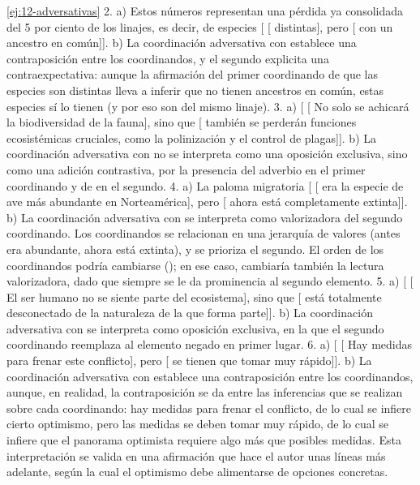 \begin{solucion}{\ref{ej:12-adversativas}}
2. a) Estos números representan una pérdida ya consolidada del 5 por ciento de
los linajes, es decir, de especies [ [ distintas],
pero [ con un ancestro en común]]. b) La coordinación
adversativa con  establece una contraposición entre los coordinandos,
y el segundo explicita una contraexpectativa: aunque la afirmación del primer
coordinando de que las especies son distintas lleva a inferir que no tienen
ancestros en común, estas especies sí lo tienen (y por eso son del mismo linaje).
3. a) [ [ No solo se achicará la biodiversidad de la
fauna], sino que [ también se perderán funciones
ecosistémicas cruciales, como la polinización y el control de plagas]]. b) La
coordinación adversativa con  no se interpreta como una oposición
exclusiva, sino como una adición contrastiva, por la presencia del adverbio
 en el primer coordinando y de  en el segundo. 4. a)
La paloma migratoria [ [ era la especie de ave más
abundante en Norteamérica], pero [ ahora está
completamente extinta]]. b) La coordinación adversativa con  se
interpreta como valorizadora del segundo coordinando. Los coordinandos se
relacionan en una jerarquía de valores (antes era abundante, ahora está extinta),
y se prioriza el segundo. El orden de los coordinandos podría cambiarse
(); en ese caso, cambiaría también la
lectura valorizadora, dado que siempre se le da prominencia al segundo
elemento. 5.
a) [ [ El ser humano no se siente parte del
ecosistema], sino que [ está totalmente desconectado de
la naturaleza de la que forma parte]]. b) La coordinación adversativa con
 se interpreta como oposición exclusiva, en la que el segundo
coordinando reemplaza al elemento negado en primer lugar. 6. a) [
[ Hay medidas para frenar este conflicto], pero
[ se tienen que tomar muy rápido]]. b) La coordinación adversativa
con  establece una contraposición entre los coordinandos, aunque, en
realidad, la contraposición se da entre las inferencias que se realizan sobre
cada coordinando: hay medidas para frenar el conflicto, de lo cual se infiere
cierto optimismo, pero las medidas se deben tomar muy rápido, de lo cual se
infiere que el panorama optimista requiere algo más que posibles medidas. Esta
interpretación se valida en una afirmación que hace el autor unas líneas más
adelante, según la cual el optimismo debe alimentarse de opciones concretas.
\end{solucion}

